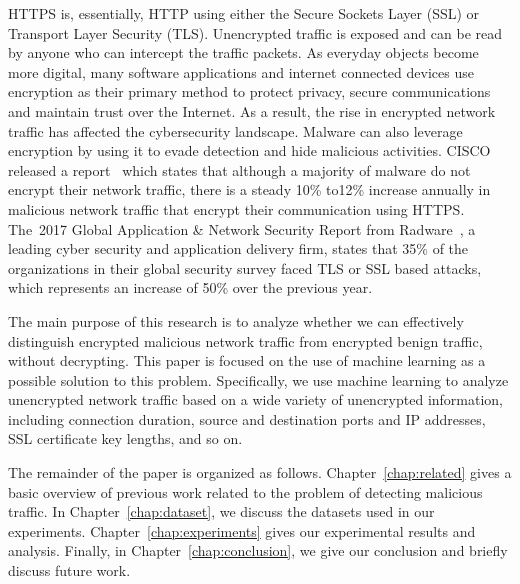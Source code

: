 HTTPS is, essentially, HTTP using either the Secure Sockets Layer (SSL) or Transport Layer Security (TLS). Unencrypted traffic is exposed and can be read by anyone who can intercept the traffic packets. As everyday objects become more digital, many software applications and internet connected devices use encryption as their primary method to protect privacy, secure communications and maintain trust over the Internet. As a result, the rise in encrypted network traffic has affected the cybersecurity landscape. Malware can also leverage encryption by using it to evade detection and hide malicious activities. CISCO released a report~\cite{Anderson16} which states that although a majority of malware do not encrypt their network traffic, there is a steady 10\% to12\% increase annually in malicious network traffic that encrypt their communication using HTTPS. The~2017 Global Application \& Network Security Report from 
Radware~\cite{Radware17}, a leading cyber security and application delivery firm, states that 35\% of the organizations in their global security survey faced TLS or SSL based attacks, which represents an increase of 50\% over the previous year.

The main purpose of this research is to analyze whether we can effectively distinguish encrypted malicious network traffic from encrypted benign traffic, without decrypting. This paper is focused on the use of machine learning as a possible solution to this problem. Specifically, we use machine learning to analyze unencrypted network traffic based on a wide variety of unencrypted information, including connection duration, source and destination ports and IP addresses, SSL certificate key lengths, and so on.

The remainder of the paper is organized as follows. Chapter~\ref{chap:related} gives a basic overview of previous work related to the problem of detecting malicious traffic. In Chapter~\ref{chap:dataset}, we discuss the datasets used in our experiments. Chapter~\ref{chap:experiments} gives our experimental results and analysis. Finally, in Chapter~\ref{chap:conclusion}, we give our conclusion and briefly discuss future work.
